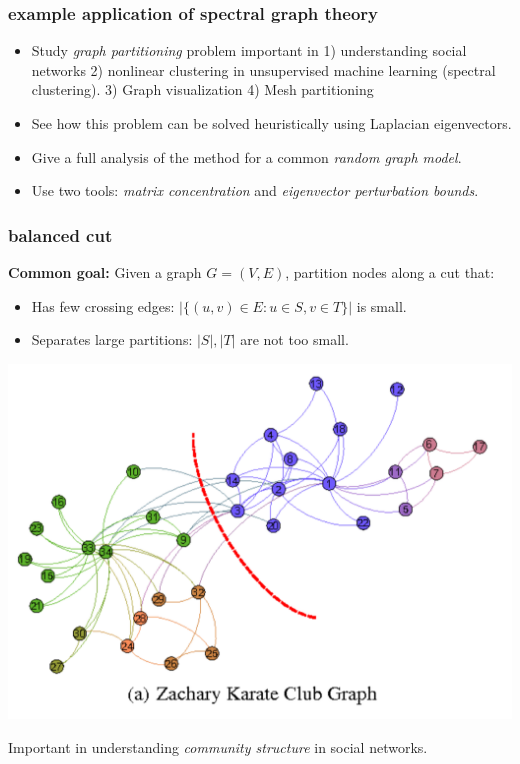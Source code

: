 \documentclass[compress]{beamer}
\begin{document}
\begin{frame}
	\frametitle{example application of spectral graph theory}
	\begin{itemize}
		\item Study \emph{graph partitioning} problem important in 1) understanding social networks 2) nonlinear clustering in unsupervised machine learning (spectral clustering).  3) Graph visualization 4) Mesh partitioning
		\item See how this problem can be solved heuristically using Laplacian eigenvectors. 
		\item Give a full analysis of the method for a common \emph{random graph model}.
		\item Use two tools: \emph{matrix concentration} and \emph{eigenvector perturbation bounds}.
	\end{itemize}
\end{frame}


\begin{frame}
	\frametitle{balanced cut}
	\textbf{Common goal:} Given a graph $G = (V,E)$, partition nodes along a cut that:
	\begin{itemize}
		\item Has few crossing edges: $|\{(u,v) \in E: u\in S,v\in T \}|$ is small.
		\item Separates large partitions: $|S|,|T|$ are not too small.
	\end{itemize}
\vspace{-.5em}
	\begin{center}
		\includegraphics[width=.55\textwidth]{karate.png}
		\vspace{-1em}
	\end{center}
	Important in understanding \emph{community structure} in social networks. 
\end{frame}
\end{document}
